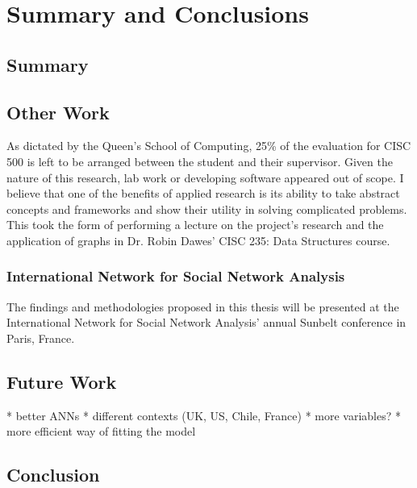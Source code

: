 \chapter{Summary and Conclusions}\label{ch:Conclusion}

\section{Summary}

\section{Other Work}

As dictated by the Queen’s School of Computing, 25\% of the evaluation for CISC
500 is left to be arranged between the student and their supervisor. Given the
nature of this research, lab work or developing software appeared out of scope.
I believe that one of the benefits of applied research is its ability to take
abstract concepts and frameworks and show their utility in solving complicated
problems. This took the form of performing a lecture on the project's research
and the application of graphs in Dr. Robin Dawes’ CISC 235: Data Structures course.

\subsection{International Network for Social Network Analysis}

The findings and methodologies proposed in this thesis will be presented at the
International Network for Social Network Analysis' annual Sunbelt
conference in Paris, France.

\section{Future Work}

* better ANNs 
* different contexts (UK, US, Chile, France)
* more variables?
* more efficient way of fitting the model

\section{Conclusion}
